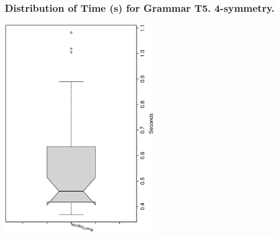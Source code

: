  \begin{frame}
 \frametitle{ Distribution of Time (s) for Grammar T5. 4-symmetry. }
 \begin{center}
\includegraphics[width=0.5\textwidth, angle=-90]
{ExpFboxplottSeconds002.eps}
 \end{center}
 \label{ExpFboxplottSeconds002.eps}  
 \end{frame}

